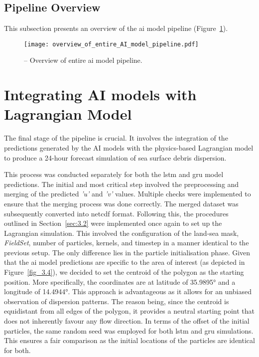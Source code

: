 \subsection{Pipeline Overview}
\label{subsec:3.3.4}

This subsection presents an overview of the \acrshort{ai} model pipeline (Figure~\ref{fig_3.8}). 

\begin{figure}[htbp]
    \centering
    \texttt{[image: overview\_of\_entire\_AI\_model\_pipeline.pdf]}
    \caption[Overview of entire AI model pipeline.]{-- Overview of entire \acrshort{ai} model pipeline.\label{fig_3.8}}
\end{figure}

\section{Integrating AI models with Lagrangian Model}
\label{sec:3.4}

The final stage of the pipeline is crucial. It involves the integration of the predictions generated by the AI models with the physics-based Lagrangian model to produce a 24-hour forecast simulation of sea surface debris dispersion.

This process was conducted separately for both the \acrshort{lstm} and \acrshort{gru} model predictions. The initial and most critical step involved the preprocessing and merging of the predicted \textit{'u'} and \textit{'v'} values. Multiple checks were implemented to ensure that the merging process was done correctly. The merged dataset was subsequently converted into \acrshort{netcdf} format. Following this, the procedures outlined in Section~\ref{sec:3.2} were implemented once again to set up the Lagrangian simulation. This involved the configuration of the land-sea mask, \textit{FieldSet}, number of particles, kernels, and timestep in a manner identical to the previous setup. The only difference lies in the particle initialisation phase. Given that the \acrshort{ai} model predictions are specific to the area of interest (as depicted in Figure~\ref{fig_3.4}), we decided to set the centroid of the polygon as the starting position. More specifically, the coordinates are at latitude of 35.9895° and a longitude of 14.4944°. This approach is advantageous as it allows for an unbiased observation of dispersion patterns. The reason being, since the centroid is equidistant from all edges of the polygon, it provides a neutral starting point that does not inherently favour any flow direction. In terms of the offset of the initial particles, the same random seed was employed for both \acrshort{lstm} and \acrshort{gru} simulations. This ensures a fair comparison as the initial locations of the particles are identical for both.

